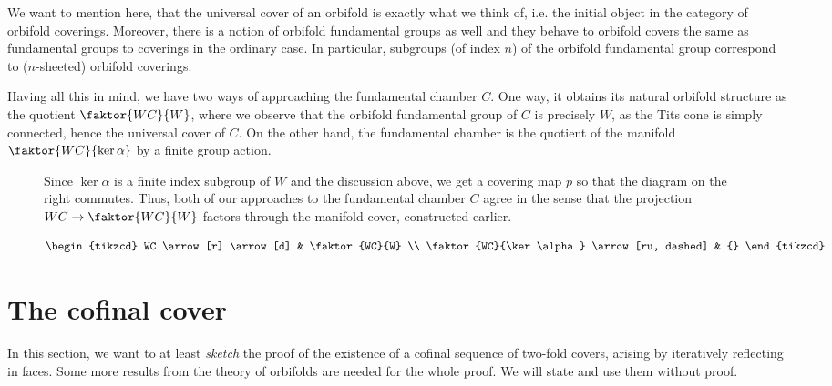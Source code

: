 \begin{remark}
    We want to mention here, that the universal cover of an orbifold is exactly what we think of, i.e. the initial object in the category of orbifold coverings.
    Moreover, there is a notion of orbifold fundamental groups as well and they behave to orbifold covers the same as fundamental groups to coverings in the ordinary case.
    In particular, subgroups (of index \(n\)) of the orbifold fundamental group correspond to (\(n\)-sheeted) orbifold coverings.
\end{remark}
    
Having all this in mind, we have two ways of approaching the fundamental chamber \(C\).
One way, it obtains its natural orbifold structure as the quotient \(\faktor{WC}{W}\), where we observe that the orbifold fundamental group of \(C\) is precisely \(W\), as the Tits cone is simply connected, hence the universal cover of \(C\).
On the other hand, the fundamental chamber is the quotient of the manifold \(\faktor{WC}{\ker\alpha}\) by a finite group action.
\vspace*{\parskip}
\begin{figure}[h!]
    \begin{minipage}[c]{.66\textwidth}
        Since \(\ker\alpha\) is a finite index subgroup of \(W\) and the discussion above, we get a covering map \(p\) so that the diagram on the right commutes.
        Thus, both of our approaches to the fundamental chamber \(C\) agree in the sense that the projection \(WC \to \faktor{WC}{W}\) factors through the manifold cover, constructed earlier.
    \end{minipage}\quad
    \begin{minipage}{.3\textwidth}\vspace*{-2em}
        \[\begin{tikzcd}
            WC \arrow[r] \arrow[d] & \faktor{WC}{W} \\
            \faktor{WC}{\ker\alpha} \arrow[ru, dashed] & {}
        \end{tikzcd}\]
    \end{minipage}
\end{figure}

\section{The cofinal cover}

In this section, we want to at least \emph{sketch} the proof of the existence of a cofinal sequence of two-fold covers, arising by iteratively reflecting in faces.
Some more results from the theory of orbifolds are needed for the whole proof.
We will state and use them without proof.

